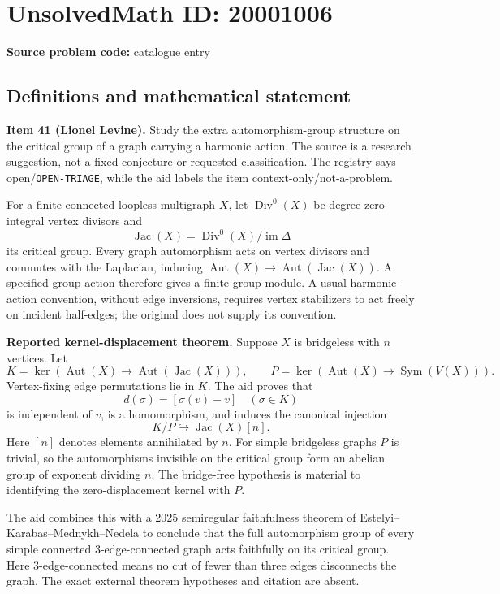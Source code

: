\documentclass[11pt]{article}
\begin{document}
\section*{UnsolvedMath ID: 20001006}
\textbf{Source problem code:} catalogue entry
\subsection{Definitions and mathematical statement}
\textbf{Item 41 (Lionel Levine).} Study the extra automorphism-group structure on the critical group of a graph carrying a harmonic action. The source is a research suggestion, not a fixed conjecture or requested classification. The registry says open/\texttt{OPEN-TRIAGE}, while the aid labels the item context-only/not-a-problem.

For a finite connected loopless multigraph $X$, let $\operatorname{Div}^0(X)$ be degree-zero integral vertex divisors and
\[
 \operatorname{Jac}(X)=\operatorname{Div}^0(X)/\operatorname{im}\Delta
\]
its critical group. Every graph automorphism acts on vertex divisors and commutes with the Laplacian, inducing $\operatorname{Aut}(X)\to\operatorname{Aut}(\operatorname{Jac}(X))$. A specified group action therefore gives a finite group module. A usual harmonic-action convention, without edge inversions, requires vertex stabilizers to act freely on incident half-edges; the original does not supply its convention.

\textbf{Reported kernel-displacement theorem.} Suppose $X$ is bridgeless with $n$ vertices. Let
\[
 K=\ker(\operatorname{Aut}(X)\to\operatorname{Aut}(\operatorname{Jac}(X))),\qquad
 P=\ker(\operatorname{Aut}(X)\to\operatorname{Sym}(V(X))).
\]
Vertex-fixing edge permutations lie in $K$. The aid proves that
\[
 d(\sigma)=[\sigma(v)-v]\quad(\sigma\in K)
\]
is independent of $v$, is a homomorphism, and induces the canonical injection
\[
 K/P\hookrightarrow\operatorname{Jac}(X)[n].
\]
Here $[n]$ denotes elements annihilated by $n$. For simple bridgeless graphs $P$ is trivial, so the automorphisms invisible on the critical group form an abelian group of exponent dividing $n$. The bridge-free hypothesis is material to identifying the zero-displacement kernel with $P$.

The aid combines this with a 2025 semiregular faithfulness theorem of Estelyi--Karabas--Mednykh--Nedela to conclude that the full automorphism group of every simple connected $3$-edge-connected graph acts faithfully on its critical group. Here $3$-edge-connected means no cut of fewer than three edges disconnects the graph. The exact external theorem hypotheses and citation are absent.
\end{document}

